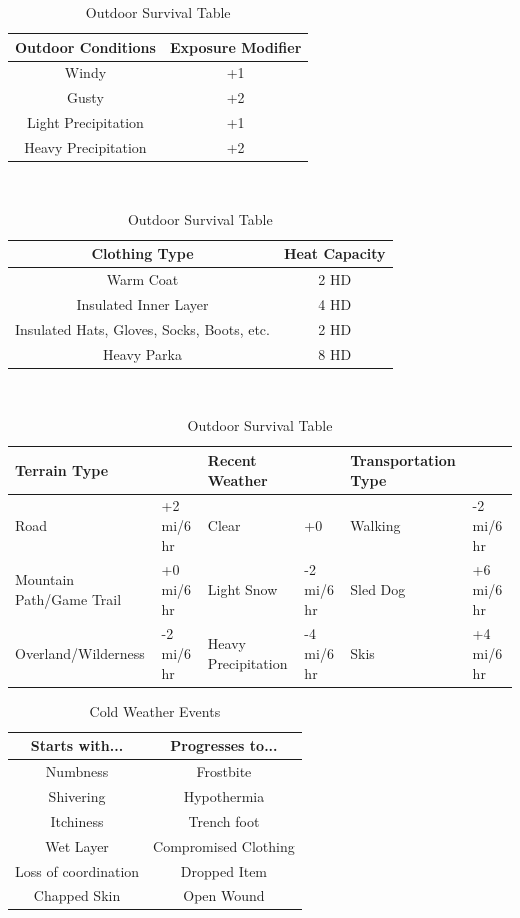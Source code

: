 \documentclass[notitlepage]{article}
\begin{document}
\begin{table}[h]
  \centering \large
  \begin{tabular}{|c||c|}
    \hline Outdoor Conditions & Exposure Modifier \\ \hline
    Windy & +1 \\
    Gusty & +2 \\
    Light Precipitation & +1 \\
    Heavy Precipitation & +2 \\ \hline
  \end{tabular} \\

  \begin{tabular}{|c||c|}
    \hline Clothing Type & Heat Capacity \\ \hline
    Warm Coat & 2 HD \\
    Insulated Inner Layer & 4 HD \\
    Insulated Hats, Gloves, Socks, Boots, etc. & 2 HD \\
    Heavy Parka & 8 HD \\ \hline
  \end{tabular} \\

  \begin{tabular}{|p{}|l||p{}|l||p{}|l|}
    \hline Terrain Type & & Recent Weather & & Transportation Type & \\ \hline
    Road & +2 mi/6 hr & Clear& +0 & Walking & -2 mi/6 hr \\
    Mountain Path/Game Trail & +0 mi/6 hr & Light Snow & -2 mi/6 hr & Sled Dog & +6 mi/6 hr \\
    Overland/Wilderness & -2 mi/6 hr & Heavy Precipitation & -4 mi/6 hr & Skis & +4 mi/6 hr \\ \hline
  \end{tabular}
  \caption{Outdoor Survival Table}
  \label{tab:outdoor-survival}
\end{table}

\begin{table}[h]
  \centering
  \begin{tabular}{|c|c|}
    \hline Starts with... & Progresses to... \\ \hline
    Numbness & Frostbite \\
    Shivering & Hypothermia \\
    Itchiness & Trench foot \\
    Wet Layer & Compromised Clothing \\ 
    Loss of coordination & Dropped Item \\
    Chapped Skin & Open Wound \\ \hline
  \end{tabular}
  \caption{Cold Weather Events}
  \label{tab:cold-events}
\end{table}
\end{document}
